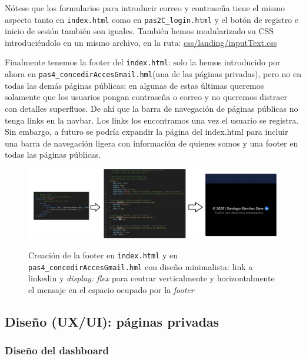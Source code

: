 \documentclass[a4paper,12pt]{report}
\begin{document}
	Nótese que los formularios para introducir correo y contraseña tiene el mismo aspecto tanto en \texttt{index.html} como en \texttt{pas2C\_login.html} y el botón de registro e inicio de sesión también son iguales. También hemos modularizado su CSS introduciéndolo en un mismo archivo, en la ruta: \href{https://github.com/blackcub3s/mercApp/blob/main/APP%20WEB/__frontend__produccio__/app/css/landing/inputText.css}{css/landing/inputText.css}
	
	Finalmente tenemos la footer del \texttt{index.html}: solo la hemos introducido por ahora en \texttt{pas4\_concedirAccesGmail.hml}(una de las páginas privadas), pero no en todas las demás páginas públicas: en algunas de estas últimas queremos solamente que los usuarios pongan contraseña o correo y no queremos distraer con detalles superfluos. De ahí que la barra de navegación de páginas públicas no tenga links en la navbar. Los links los encontramos una vez el usuario se registra. Sin embargo, a futuro se podría expandir la página del index.html para incluir una barra de navegación ligera con información de quienes somos y una footer en todas las páginas públicas.
	
	
	\FloatBarrier
	\setlength{\belowcaptionskip}{3pt}
	\begin{figure}[H]
		\centering
		\caption{Creación de la footer en \texttt{index.html} y en \texttt{pas4\_concedirAccesGmail.hml} con diseño minimalista: link a linkedin y \textit{display: flex} para centrar verticalmente y horizontalmente el mensaje en el espacio ocupado por la \textit{footer}}
		\includegraphics[width=1\linewidth]{img/footerIndexIpas4}
		\label{fig:footerIndexIpas4}
	\end{figure}
	\FloatBarrier
	
	
	
	
	
	
	\subsection{Diseño (UX/UI): páginas privadas}
	\label{sec:disenyoResponsivePrivadas}
	
	\subsubsection{Diseño del dashboard}
	
\end{document}
